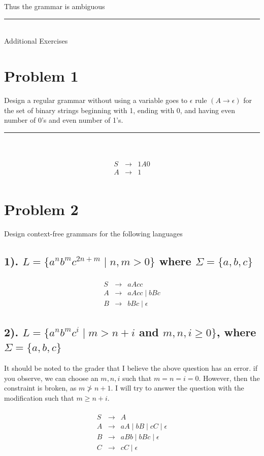\documentclass[20pt]{article} %
\begin{document}
Thus the grammar is ambiguous

\noindent\rule{15cm}{0.4pt} \\
Additional Exercises
\section{Problem 1}
Design a regular grammar without using a variable goes to $\epsilon$ rule $(A \rightarrow \epsilon)$ for the set of binary strings beginning with 1, ending with 0, and having even number of 0's and even number of 1's.
 \noindent\rule{2cm}{0.4pt} \\

 \begin{table}[!htbp]
 \[\begin{array}{ccc} 
&  \\
 S & \rightarrow & 1A0 \\
 A & \rightarrow &  1 \\
 \end{array}\]
 \end{table}

\section{Problem 2}
Design context-free grammars for the following languages
\subsection{1). $L = \{ a^{n}b^{m}c^{2n+m} \mid n,m > 0\}$ where $\Sigma = \{a,b,c\}$}
 \begin{table}[!htbp]
 \[\begin{array}{ccc} 
&  \\
 S & \rightarrow & aAcc \\
 A & \rightarrow & aAcc \mid bBc\\
 B & \rightarrow & bBc \mid \epsilon
 \end{array}\]
 \end{table}
\newpage
\subsection{2). $L = \{a^{n}b^{m}c^{i} \mid m > n + i$ and $m,n,i \geq 0\}$, where $\Sigma = \{a,b,c\}$}
It should be noted to the grader that I believe the above question has an error. if you observe, we can choose an $m,n,i$ such that $m=n=i=0$. However, then the constraint is broken, as $m \ngtr n+1$.  I will try to answer the question with the modification such that $m \geq n + i$.
 \begin{table}[!htbp]
 \[\begin{array}{ccc} 
&  \\
 S & \rightarrow & A \\
 A & \rightarrow & aA \mid bB \mid cC \mid \epsilon \\
 B & \rightarrow & aBb \mid bBc \mid \epsilon \\
 C & \rightarrow & cC \mid \epsilon 
 \end{array}\]
 \end{table}
\end{document}
